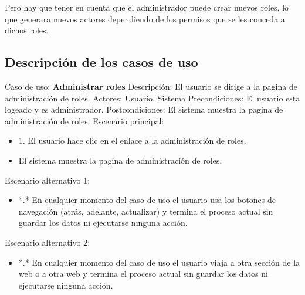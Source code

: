 Pero hay que tener en cuenta que el administrador puede crear nuevos roles, lo que generara nuevos actores dependiendo de los permisos que se les conceda a dichos roles.

\newpage

\subsection{Descripción de los casos de uso}
Caso de uso:  \textbf{Administrar roles}
\newline
Descripción: El usuario se dirige a la pagina de administración de roles.
\newline
Actores: Usuario, Sistema
\newline
Precondiciones: El usuario esta logeado y es administrador.
\newline
Postcondiciones: El sistema muestra la pagina de administración de roles.
\newline
Escenario principal:
\begin{itemize}
	\item 1. El usuario hace clic en el enlace a la administración de roles.
	\item El sistema muestra la pagina de administración de roles.
\end{itemize}

Escenario alternativo 1: 
\begin{itemize}
	\item *.* En cualquier momento del caso de uso el usuario usa los botones de navegación (atrás, adelante, actualizar) y termina el proceso actual sin guardar los datos ni ejecutarse ninguna acción.
\end{itemize}
Escenario alternativo 2:
\begin{itemize}
\item *.* En cualquier momento del caso de uso el usuario viaja a otra sección de la web o a otra web y termina el proceso actual sin guardar los datos ni ejecutarse ninguna acción.
\end{itemize}

